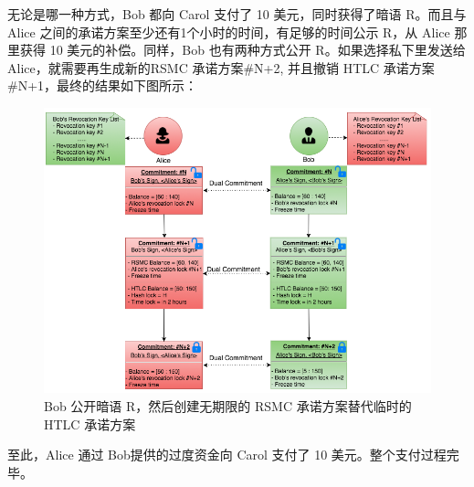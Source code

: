 \begin{appendices}
无论是哪一种方式，Bob 都向 Carol 支付了 10 美元，同时获得了暗语 R。而且与Alice 之间的承诺方案至少还有1个小时的时间，有足够的时间公示 R，从 Alice 那里获得 10 美元的补偿。同样，Bob 也有两种方式公开 R。如果选择私下里发送给 Alice，就需要再生成新的RSMC 承诺方案\#N+2, 并且撤销 HTLC 承诺方案\#N+1，最终的结果如下图所示：
\begin{figure}[h!]
    \centering
    \includegraphics[width=12cm, keepaspectratio]{../images/alice_bob_3.png}
    \caption{Bob 公开暗语 R，然后创建无期限的 RSMC 承诺方案替代临时的 HTLC 承诺方案}
    \label{fig:alice_bob_3}
\end{figure}

至此，Alice 通过 Bob提供的过度资金向 Carol 支付了 10 美元。整个支付过程完毕。
\end{appendices}

